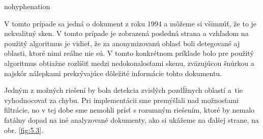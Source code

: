\begin{hyphenrules}{nohyphenation}
\begin{figure}[H]
\begin{minipage}[b]{.5\linewidth}
\end{minipage}
\end{figure}

V tomto prípade sa jedná o dokument z roku 1994 a môžeme si všimnúť, že to je nekvalitný sken. V tomto prípade je zobrazená posledná strana a vzhľadom na použitý algoritmus je vidieť, že za anonymizovanú oblasť boli detegované aj oblasti, ktoré nimi reálne nie sú. V tomto konkrétnom príklade bolo pre použitý algoritmus obtiažne rozlíšiť medzi nedokonalosťami skenu, zväzujúcou šnúrkou a najskôr nálepkami prekrývajúce dôležité informácie tohto dokumentu. 
\newline

Jedným z možných riešení by bola detekcia zvislých pozdĺžnych oblastí a~tie vyhodnocovať za chybu. Pri implementácii sme premýšľali nad možnosťami filtrácie, no v tej dobe sme nemohli prísť s rozumným riešením, ktoré by nemalo fatálny dopad na iné analyzované dokumenty, ako si ukážeme na ďalšej strane, na obr. \ref{fig:5.3}.


\end{hyphenrules}
